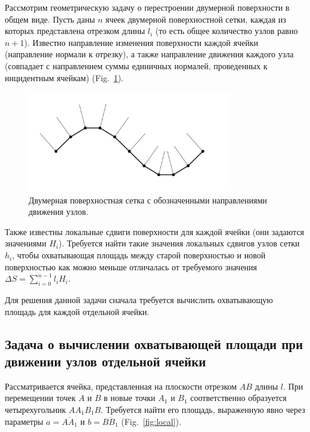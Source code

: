 \documentclass[
11pt,%
tightenlines,%
twoside,%
onecolumn,%
nofloats,%
nobibnotes,%
nofootinbib,%
superscriptaddress,%
noshowpacs,%
centertags]%
{revtex4}
\begin{document}
Рассмотрим геометрическую задачу о перестроении двумерной поверхности в общем виде.
Пусть даны $n$ ячеек двумерной поверхностной сетки, каждая из которых представлена отрезком длины $l_i$ (то есть общее количество узлов равно $n + 1$).
Известно направление изменения поверхности каждой ячейки (направление нормали к отрезку), а также направление движения каждого узла (совпадает с направлением суммы единичных нормалей, проведенных к инцидентным ячейкам) (Fig.~\ref{fig:grid_normals}).

\begin{figure}[h]
\setcaptionmargin{5mm}
\onelinecaptionstrue
\includegraphics[width=0.8\textwidth]{pics/grid_normals.pdf}
\caption{Двумерная поверхностная сетка с обозначенными направлениями движения узлов.}
\label{fig:grid_normals}
\end{figure}

Также известны локальные сдвиги поверхности для каждой ячейки (они задаются значениями $H_i$).
Требуется найти такие значения локальных сдвигов узлов сетки $h_i$, чтобы охватывающая площадь между старой поверхностью и новой поверхностью как можно меньше отличалась от требуемого значения $\Delta S = \sum_{i = 0}^{n - 1}l_iH_i$.

Для решения данной задачи сначала требуется вычислить охватывающую площадь для каждой отдельной ячейки.

\subsection{Задача о вычислении охватывающей площади при движении узлов отдельной ячейки}

Рассматривается ячейка, представленная на плоскости отрезком $AB$ длины $l$.
При перемещении точек $A$ и $B$ в новые точки $A_1$ и $B_1$ соответственно образуется четырехугольник $AA_1B_1B$.
Требуется найти его площадь, выраженную явно через параметры $a = \overline{AA_1}$ и $b = \overline{BB_1}$ (Fig.~\ref{fig:local}).
\end{document}

